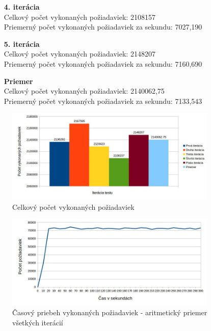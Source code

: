 \documentclass[12pt,oneside,final]{fithesis-utf8}
\begin{document}
\begin{itemize}
\begin{itemize}
\item[\textbf{4. iterácia}]\ \\
Celkový počet vykonaných požiadaviek: 2108157\\
Priemerný počet vykonaných požiadaviek za sekundu: 7027,190

\item[\textbf{5. iterácia}]\ \\
Celkový počet vykonaných požiadaviek: 2148207\\
Priemerný počet vykonaných požiadaviek za sekundu: 7160,690

\item[\textbf{Priemer}]\ \\
Celkový počet vykonaných požiadaviek: 2140062,75\\
Priemerný počet vykonaných požiadaviek za sekundu: 7133,543

\end{itemize}

\begin{figure}[H]
  \centering
      \includegraphics[width=0.9\textwidth]{gatling2_3.jpg}
  \caption{Celkový počet vykonaných požiadaviek}
\end{figure}

\begin{figure}[H]
  \centering
      \includegraphics[width=0.9\textwidth]{gatling2_3_distr.jpg}
  \caption{Časový priebeh vykonaných požiadaviek - aritmetický priemer všetkých iterácií}
\end{figure}


\end{itemize}
\end{document}
